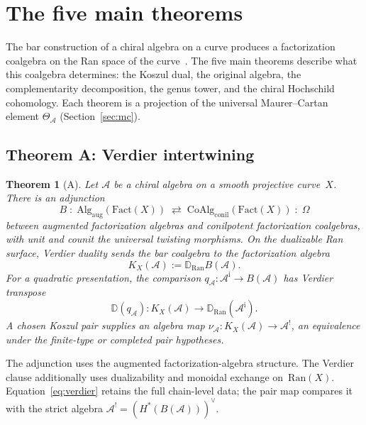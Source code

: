\documentclass[11pt,reqno]{amsart}
\newtheorem{theorem}{Theorem}[section]
\theoremstyle{definition}
\theoremstyle{remark}
\newcommand{\cA}{\mathcal{A}}
\newcommand{\Ran}{\mathrm{Ran}}
\numberwithin{equation}{section}
\begin{document}
\section{The five main theorems}
\label{sec:five-theorems}

The bar construction of a chiral algebra on a curve produces
a factorization coalgebra on the Ran space of the
curve~\cite{BD04,CG17}.
The five main theorems describe what this coalgebra
determines: the Koszul dual, the original algebra,
the complementarity decomposition, the genus tower, and
the chiral Hochschild cohomology. Each theorem is a
projection of the universal Maurer--Cartan element
$\Theta_\cA$ (Section~\ref{sec:mc}).

\subsection{Theorem A: Verdier intertwining}
\label{ssec:thm-a}

\begin{theorem}[A]\label{thm:A}
Let\/ $\cA$ be a chiral algebra on a smooth projective
curve~$X$. There is an adjunction
\[
B
\;\colon\;
\mathrm{Alg}_{\mathrm{aug}}(\mathrm{Fact}(X))
\;\rightleftarrows\;
\mathrm{CoAlg}_{\mathrm{conil}}(\mathrm{Fact}(X))
\;\colon\;
\Omega
\]
between augmented factorization algebras and conilpotent
factorization coalgebras, with unit and counit the
universal twisting morphisms.  On the dualizable Ran surface,
Verdier duality sends the bar coalgebra to the factorization algebra
\begin{equation}\label{eq:verdier}
K_X(\cA):=\mathbb{D}_{\Ran}B(\cA).
\end{equation}
For a quadratic presentation, the comparison
$q_\cA\colon\cA^{\mathrm i}\to B(\cA)$ has Verdier transpose
\[
\mathbb D(q_\cA)\colon K_X(\cA)\longrightarrow
\mathbb D_{\Ran}(\cA^{\mathrm i}).
\]
A chosen Koszul pair supplies an algebra map
$\nu_\cA\colon K_X(\cA)\to\cA^!$, an equivalence under the
finite-type or completed pair hypotheses.
\end{theorem}

The adjunction uses the augmented factorization-algebra structure.
The Verdier clause additionally uses dualizability and monoidal
exchange on~$\Ran(X)$.  Equation~\eqref{eq:verdier} retains the full
chain-level data; the pair map compares it with the strict algebra
$\cA^!=(H^*(B(\cA)))^\vee$.
\end{document}
